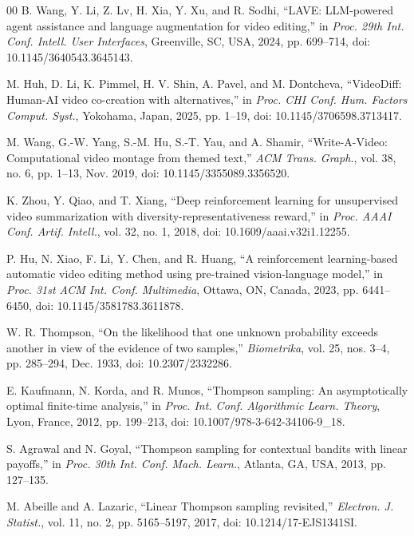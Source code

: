 \documentclass{ieeeaccess}
\begin{document}
\begin{thebibliography}{00}
 B. Wang, Y. Li, Z. Lv, H. Xia, Y. Xu, and R. Sodhi, ``LAVE: LLM-powered agent assistance and language augmentation for video editing,'' in \emph{Proc. 29th Int. Conf. Intell. User Interfaces}, Greenville, SC, USA, 2024, pp. 699--714, doi: 10.1145/3640543.3645143.

 M. Huh, D. Li, K. Pimmel, H. V. Shin, A. Pavel, and M. Dontcheva, ``VideoDiff: Human-AI video co-creation with alternatives,'' in \emph{Proc. CHI Conf. Hum. Factors Comput. Syst.}, Yokohama, Japan, 2025, pp. 1--19, doi: 10.1145/3706598.3713417.

 M. Wang, G.-W. Yang, S.-M. Hu, S.-T. Yau, and A. Shamir, ``Write-A-Video: Computational video montage from themed text,'' \emph{ACM Trans. Graph.}, vol. 38, no. 6, pp. 1--13, Nov. 2019, doi: 10.1145/3355089.3356520.

 K. Zhou, Y. Qiao, and T. Xiang, ``Deep reinforcement learning for unsupervised video summarization with diversity-representativeness reward,'' in \emph{Proc. AAAI Conf. Artif. Intell.}, vol. 32, no. 1, 2018, doi: 10.1609/aaai.v32i1.12255.

 P. Hu, N. Xiao, F. Li, Y. Chen, and R. Huang, ``A reinforcement learning-based automatic video editing method using pre-trained vision-language model,'' in \emph{Proc. 31st ACM Int. Conf. Multimedia}, Ottawa, ON, Canada, 2023, pp. 6441--6450, doi: 10.1145/3581783.3611878.

 W. R. Thompson, ``On the likelihood that one unknown probability exceeds another in view of the evidence of two samples,'' \emph{Biometrika}, vol. 25, nos. 3--4, pp. 285--294, Dec. 1933, doi: 10.2307/2332286.

 E. Kaufmann, N. Korda, and R. Munos, ``Thompson sampling: An asymptotically optimal finite-time analysis,'' in \emph{Proc. Int. Conf. Algorithmic Learn. Theory}, Lyon, France, 2012, pp. 199--213, doi: 10.1007/978-3-642-34106-9\_18.

 S. Agrawal and N. Goyal, ``Thompson sampling for contextual bandits with linear payoffs,'' in \emph{Proc. 30th Int. Conf. Mach. Learn.}, Atlanta, GA, USA, 2013, pp. 127--135.

 M. Abeille and A. Lazaric, ``Linear Thompson sampling revisited,'' \emph{Electron. J. Statist.}, vol. 11, no. 2, pp. 5165--5197, 2017, doi: 10.1214/17-EJS1341SI.


\end{thebibliography}
\end{document}
